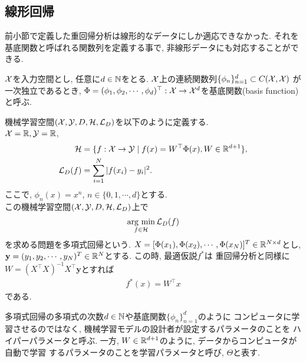 \subsection{線形回帰}
前小節で定義した重回帰分析は線形的なデータにしか適応できなかった. それを
基底関数と呼ばれる関数列を定義する事で, 非線形データにも対応することができる.
\begin{Defi}[基底関数]
    $\mathcal{X}$を入力空間とし, 任意に$d\in\mathbb{N}$をとる. $\mathcal{X}$上の連続関数列$\{\phi_{n}\}_{n = 1}^{d}\subset C(\mathcal{X}, \mathcal{X})$
    が一次独立であるとき, $\Phi = (\phi_1, \phi_2, \cdots, \phi_d)^{\top}:\mathcal{X}\to\mathcal{X}^{d}$を基底関数(basis function)と呼ぶ.
\end{Defi}
\begin{Ex}[多項式回帰]
    機械学習空間$(\mathcal{X}, \mathcal{Y}, D, \mathcal{H}, \mathcal{L}_{D})$を以下のように定義する.\\
    $\mathcal{X} = \mathbb{R}, \mathcal{Y} = \mathbb{R}$, 
    \begin{align*}
        \mathcal{H} &= \{f:\mathcal{X}\to\mathcal{Y}\mid f(x) = W^{\top}\Phi(x), W\in\mathbb{R}^{d + 1}\},\\
        \mathcal{L}_{D}(f) &= \sum_{i = 1}^{N}|f(x_i) - y_i|^2.
    \end{align*}
    ここで, $\phi_{n}(x) = x^{n}$, $n\in\{0, 1, \cdots, d\}$とする.\\
    この機械学習空間$(\mathcal{X}, \mathcal{Y}, D, \mathcal{H}, \mathcal{L}_{D})$上で
    \begin{align*}
        \mathop{\rm arg~min}\limits_{f\in\mathcal{H}}\mathcal{L}_{D}(f)
    \end{align*}
    を求める問題を多項式回帰という. $X = [\Phi(x_1), \Phi(x_{2}), \cdots, \Phi(x_N)]^{T}\in\mathbb{R}^{N\times d}$とし, 
    $\mathbf{y} = (y_{1}, y_{2}, \cdots, y_{N})^{T}\in\mathbb{R}^{N}$とする. この時, 最適仮説$f^{*}$は
    重回帰分析と同様に$W = (X^\top X)^{-1}X^\top\mathbf{y}$とすれば
    \begin{align*}
        f^{*}(x) = W^{\top}x
    \end{align*}
    である. 
\end{Ex}
\begin{Rem}[ハイパーパラメータと学習パラメータ]
    多項式回帰の多項式の次数$d\in\mathbb{N}$や基底関数$\{\phi_{n}\}_{n = 1}^{d}$のように
    コンピュータに学習させるのではなく, 機械学習モデルの設計者が設定するパラメータのことを
    ハイパーパラメータと呼ぶ. 一方, $W\in\mathbb{R}^{d + 1}$のように, データからコンピュータが自動で学習
    するパラメータのことを学習パラメータと呼び, $\Theta$と表す.
\end{Rem}
